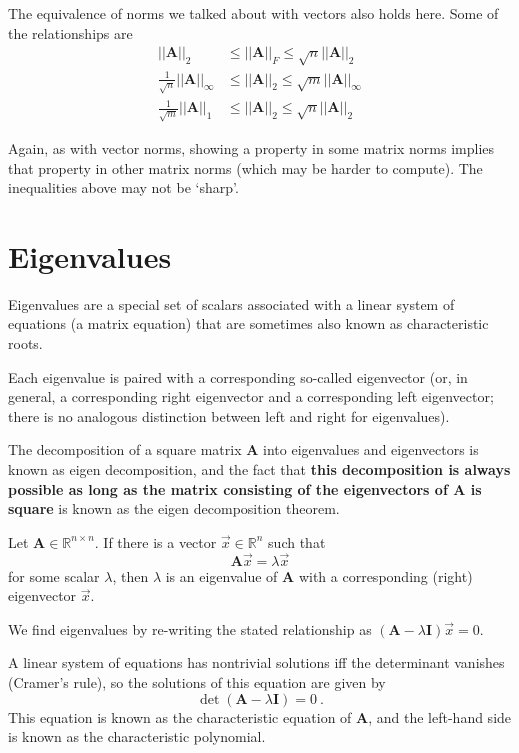 \documentclass[12pt]{article}
\newcommand{\ve}[1]{\ensuremath{\mathbf{#1}}}
\begin{document}
The equivalence of norms we talked about with vectors also holds here. Some of the relationships are
%
\begin{align}
||\ve{A}||_{2} &\leq ||\ve{A}||_{F} \leq \sqrt{n}||\ve{A}||_{2} \nonumber \\
%
\frac{1}{\sqrt{n}}||\ve{A}||_{\infty} &\leq ||\ve{A}||_{2} \leq \sqrt{m}||\ve{A}||_{\infty} \nonumber \\
%
\frac{1}{\sqrt{m}}||\ve{A}||_{1} &\leq ||\ve{A}||_{2} \leq \sqrt{n}||\ve{A}||_{2} \nonumber
\end{align}

Again, as with vector norms, showing a property in some matrix norms implies that property in other matrix norms (which may be harder to compute). The inequalities above may not be `sharp'.


\section{Eigenvalues}

Eigenvalues are a special set of scalars associated with a linear system of equations (a matrix equation) that are sometimes also known as characteristic roots. 

Each eigenvalue is paired with a corresponding so-called eigenvector (or, in general, a corresponding right eigenvector and a corresponding left eigenvector; there is no analogous distinction between left and right for eigenvalues).

The decomposition of a square matrix $\ve{A}$ into eigenvalues and eigenvectors is known as eigen decomposition, and the fact that \textbf{this decomposition is always possible as long as the matrix consisting of the eigenvectors of $\ve{A}$ is square} is known as the eigen decomposition theorem.

Let $\ve{A} \in \mathbb{R}^{n \times n}$. If there is a vector $\vec{x} \in \mathbb{R}^{n}$ such that
%
\[\ve{A} \vec{x} = \lambda \vec{x}\]
%
for some scalar $\lambda$, then $\lambda$ is an eigenvalue of $\ve{A}$ with a corresponding (right) eigenvector $\vec{x}$.
 
We find eigenvalues by re-writing the stated relationship as $(\ve{A} - \lambda \ve{I})\vec{x}=0$.

A linear system of equations has nontrivial solutions iff the determinant vanishes (Cramer's rule), so the solutions of this equation are given by
%
\[\det(\ve{A} - \lambda \ve{I})=0 \:.\] 	
%
This equation is known as the characteristic equation of $\ve{A}$, and the left-hand side is known as the characteristic polynomial.
\end{document}
